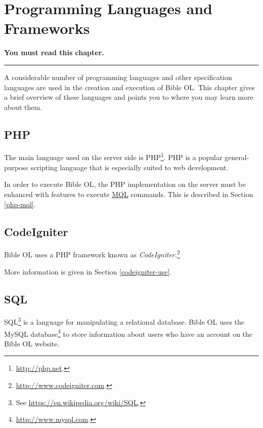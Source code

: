 \documentclass[11pt,oneside,a4paper]{memoir}
\begin{document}
\chapter{Programming Languages and Frameworks}

\textbf{You must read this chapter.}
\plainbreak{3}

A considerable number of programming languages and other specification languages are used in the
creation and execution of Bible OL. This chapter gives a brief overview of these languages and
points you to where you may learn more about them.


\section{PHP}

The main language used on the server side is PHP\footnote{\url{http://php.net}.}. PHP is a popular
general-purpose scripting language that is especially suited to web development.

In order to execute Bible OL, the PHP implementation on the server must be enhanced with features to
execute \hyperref[mql]{MQL} commands. This is described in Section \ref{php-mql}.

\section{CodeIgniter}\label{sec-codeigniter}

Bible OL uses a PHP framework known as \emph{CodeIgniter.}\footnote{\url{http://www.codeigniter.com}.}

More information is given in Section \ref{codeigniter-use}.


\section{SQL}

SQL\footnote{See \url{https://en.wikipedia.org/wiki/SQL}.} is a language for manipulating a
relational database. Bible OL uses the MySQL database\footnote{\url{http://www.mysql.com}.} to store
information about users who have an account on the Bible OL website.
\end{document}
